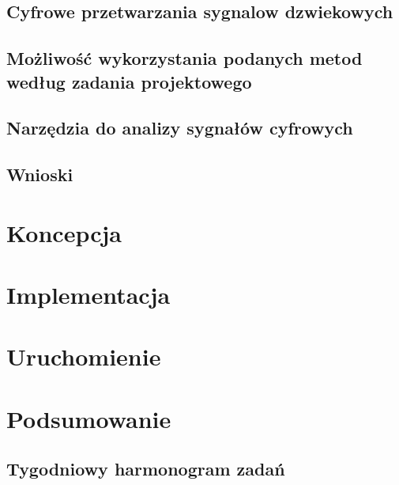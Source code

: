 \documentclass[a4paper,titleauthor]{mwart}
\begin{document}
\subsection{Cyfrowe przetwarzania sygnalow dzwiekowych}

\subsection{Możliwość wykorzystania podanych metod według zadania projektowego}

\subsection{Narzędzia do analizy sygnałów cyfrowych}

\subsection{Wnioski}

\section{Koncepcja}
\label{sec:koncepcja}

\section{Implementacja}
\label{sec:implementacja}


\section{Uruchomienie}
\label{sec:uruchomienie}


\section{Podsumowanie}
\label{sec:podsumowanie}

\subsection{Tygodniowy harmonogram zadań}
\end{document}
